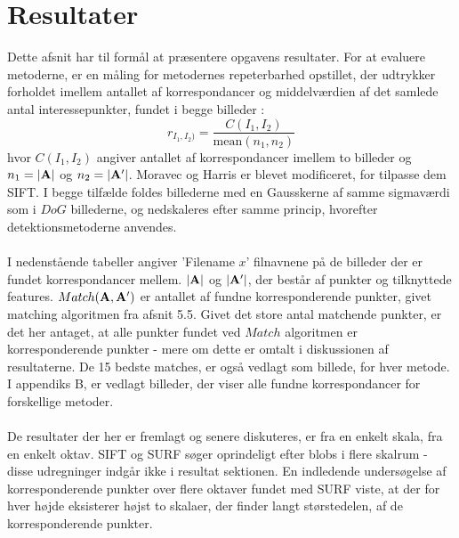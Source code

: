 \chapter{Resultater}
\label{sec:resultater}
Dette afsnit har til formål at præsentere opgavens resultater. For at evaluere metoderne, er en måling for metodernes repeterbarhed opstillet, der udtrykker forholdet imellem antallet af korrespondancer og middelværdien af det samlede antal interessepunkter, fundet i begge billeder \cite{eval}:
\begin{equation}
r_{I_1,I_2)}=\dfrac{C(I_1,I_2)}{\text{mean}(n_1,n_2)}
\end{equation}
hvor $C(I_1,I_2)$ angiver antallet af korrespondancer imellem to billeder og $n_1=\bold{|A|}$ og $n_2=\bold{|A'|}$.
Moravec og Harris er blevet modificeret, for tilpasse dem SIFT. I begge tilfælde foldes billederne med en Gausskerne af samme sigmaværdi som i $DoG$ billederne, og nedskaleres efter samme princip, hvorefter detektionsmetoderne anvendes. 
\\
\\
I nedenstående tabeller angiver 'Filename $x$' filnavnene på de billeder der er fundet korrespondancer mellem. $|\bold{A}|$ og $|\bold{A'}|$, der består af punkter og tilknyttede features. $Match(\bold{A}, \bold{A'})$ er antallet af fundne korresponderende punkter, givet matching algoritmen fra afsnit 5.5. Givet det store antal matchende punkter, er det her antaget, at alle punkter fundet ved $Match$ algoritmen er korresponderende punkter - mere om dette er omtalt i diskussionen af resultaterne. De 15 bedste matches, er også vedlagt som billede, for hver metode. I appendiks B, er vedlagt billeder, der viser alle fundne korrespondancer for forskellige metoder.
\\
\\
De resultater der her er fremlagt og senere diskuteres, er fra en enkelt skala, fra en enkelt oktav. SIFT og SURF søger oprindeligt efter blobs i flere skalrum - disse udregninger indgår ikke i resultat sektionen. En indledende undersøgelse af korresponderende punkter over flere oktaver fundet med SURF viste, at der for hver højde eksisterer højst to skalaer, der finder langt størstedelen, af de korresponderende punkter.
